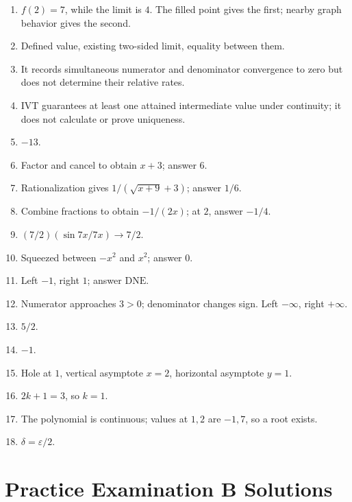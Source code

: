\documentclass[11pt,openany]{book}
\theoremstyle{bgplain}
\newcommand{\DNE}{\mathrm{DNE}}
\newcommand{\eps}{\varepsilon}
\begin{document}
\begin{enumerate}[label=\textbf{A\arabic*.}]
  \item \(f(2)=7\), while the limit is \(4\). The filled point gives the first; nearby graph behavior gives the second.
  \item Defined value, existing two-sided limit, equality between them.
  \item It records simultaneous numerator and denominator convergence to zero but does not determine their relative rates.
  \item IVT guarantees at least one attained intermediate value under continuity; it does not calculate or prove uniqueness.
  \item \(-13\).
  \item Factor and cancel to obtain \(x+3\); answer \(6\).
  \item Rationalization gives \(1/(\sqrt{x+9}+3)\); answer \(1/6\).
  \item Combine fractions to obtain \(-1/(2x)\); at \(2\), answer \(-1/4\).
  \item \((7/2)(\sin7x/7x)\to7/2\).
  \item Squeezed between \(-x^2\) and \(x^2\); answer \(0\).
  \item Left \(-1\), right \(1\); answer \(\DNE\).
  \item Numerator approaches \(3>0\); denominator changes sign. Left \(-\infty\), right \(+\infty\).
  \item \(5/2\).
  \item \(-1\).
  \item Hole at \(1\), vertical asymptote \(x=2\), horizontal asymptote \(y=1\).
  \item \(2k+1=3\), so \(k=1\).
  \item The polynomial is continuous; values at \(1,2\) are \(-1,7\), so a root exists.
  \item \(\delta=\eps/2\).
\end{enumerate}

\section{Practice Examination B Solutions}
\end{document}
